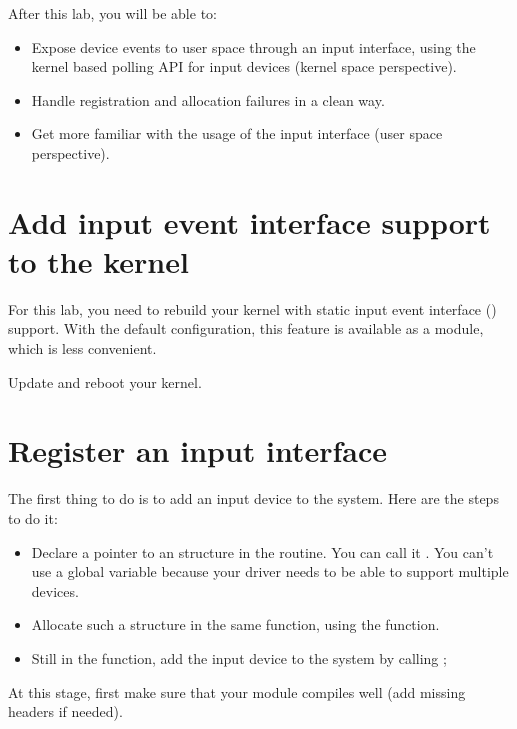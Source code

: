 
After this lab, you will be able to:

\begin{itemize}
\item Expose device events to user space through an input interface,
      using the kernel based polling API for input devices
      (kernel space perspective).
\item Handle registration and allocation failures in a clean
      way.
\item Get more familiar with the usage of the input interface
      (user space perspective).
\end{itemize}

\section{Add input event interface support to the kernel}

For this lab, you need to rebuild your kernel with static input
event interface () support. With the default
configuration, this feature is available as a module, which is less
convenient.

Update and reboot your kernel.

\section{Register an input interface}

The first thing to do is to add an input device to the system. Here are
the steps to do it:

\begin{itemize}
\item Declare a pointer to an  structure in the
       routine. You can call it .
      You can't use a global variable because your driver needs to be
      able to support multiple devices.
\item Allocate such a structure in the same function, using the
       function.
\item Still in the  function, add the input device to
      the system by calling ;
\end{itemize}

At this stage, first make sure that your module compiles well (add
missing headers if needed).

